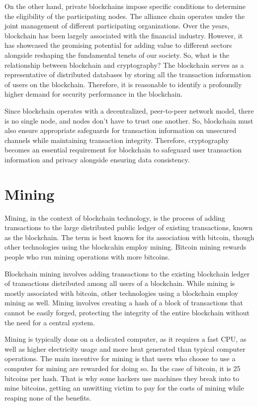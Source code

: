 \documentclass[BTech]{srmuthesis}
\begin{document}
 On the other hand, private blockchains impose specific conditions to determine the eligibility of the participating nodes. The alliance chain operates under the joint management of different participating organizations. Over the years, blockchain has been largely associated with the financial industry. However, it has showcased the promising potential for adding value to different sectors alongside reshaping the fundamental tenets of our society. 
 So, what is the relationship between blockchain and cryptography? The blockchain serves as a representative of distributed databases by storing all the transaction information of users on the blockchain. Therefore, it is reasonable to identify a profoundly higher demand for security performance in the blockchain. 

 Since blockchain operates with a decentralized, peer-to-peer network model, there is no single node, and nodes don’t have to trust one another. So, blockchain must also ensure appropriate safeguards for transaction information on unsecured channels while maintaining transaction integrity. Therefore, cryptography becomes an essential requirement for blockchain to safeguard user transaction information and privacy alongside ensuring data consistency. 

 \section{Mining}
 Mining, in the context of blockchain technology, is the process of adding transactions to the large distributed public ledger of existing transactions, known as the blockchain. The term is best known for its association with bitcoin, though other technologies using the blockcahin employ mining. Bitcoin mining rewards people who run mining operations with more bitcoins.

 Blockchain mining involves adding transactions to the existing blockchain ledger of transactions distributed among all users of a blockchain. While mining is mostly associated with bitcoin, other technologies using a blockchain employ mining as well. Mining involves creating a hash of a block of transactions that cannot be easily forged, protecting the integrity of the entire blockchain without the need for a central system.

 Mining is typically done on a dedicated computer, as it requires a fast CPU, as well as higher electricity usage and more heat generated than typical computer operations. The main incentive for mining is that users who choose to use a computer for mining are rewarded for doing so. In the case of bitcoin, it is 25 bitcoins per hash. That is why some hackers use machines they break into to mine bitcoins, getting an unwitting victim to pay for the costs of mining while reaping none of the benefits.
\end{document}
